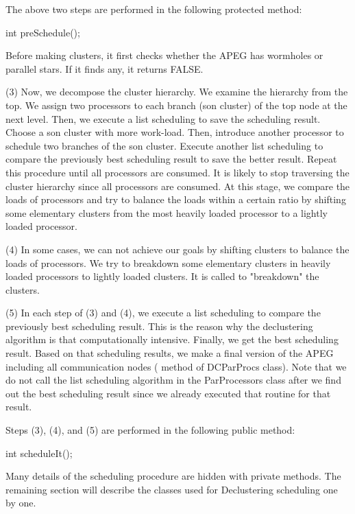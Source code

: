The above two steps are performed in the following protected method:

\begin{example}
int preSchedule();
\end{example}

Before making clusters, it first checks whether the APEG has wormholes or
parallel stars. If it finds any, it returns FALSE.

(3) Now, we decompose the cluster hierarchy. We examine the hierarchy from
the top. We assign two processors to each branch (son cluster) of the top node 
at the next level. Then, we execute a list scheduling to save 
the scheduling result. Choose a son cluster with more work-load. 
Then, introduce another processor to schedule two branches of the son cluster.
Execute another list scheduling to compare the previously best scheduling
result to save the better result. Repeat this procedure until all processors
are consumed. It is likely to stop traversing the cluster hierarchy since
all processors are consumed. At this stage, we compare the loads of
processors and try to balance the loads within a certain
ratio by shifting some elementary clusters
from the most heavily loaded processor to a lightly loaded processor.

(4) In some cases, we can not achieve our goals by shifting clusters to
balance the loads of processors. We try to breakdown some elementary
clusters in heavily loaded processors to lightly loaded clusters. It is
called to "breakdown" the clusters.

(5) In each step of (3) and (4), we execute a list scheduling to compare the
previously best scheduling result. This is the reason why the declustering
algorithm is that computationally intensive. Finally, we get the
best scheduling result. Based on that scheduling results, we make
a final version of the APEG  including all communication nodes 
( method of DCParProcs class). Note that we do not
call the list scheduling algorithm in the ParProcessors class after we find
out the best scheduling result since we already executed that routine for
that result.

Steps (3), (4), and (5) are performed in the following public method:

\begin{example}
int scheduleIt();
\end{example}

Many details of the scheduling procedure are hidden with private methods.
The remaining section will describe the classes used for Declustering
scheduling one by one.

